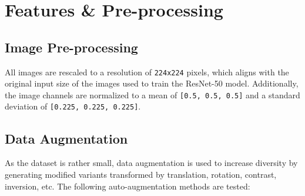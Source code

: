 \documentclass[letterpaper]{article}
\begin{document}
\section {Features \& Pre-processing}

    \subsection{Image Pre-processing}
        
        All images are rescaled to a resolution of \texttt{224x224} pixels, which aligns with the original input size of the images used to train the ResNet-50 model. Additionally, the image channels are normalized to a mean of \texttt{[0.5, 0.5, 0.5]} and a standard deviation of \texttt{[0.225, 0.225, 0.225]}. 

    \subsection{Data Augmentation}
        
        As the dataset is rather small, data augmentation is used to increase diversity by generating modified variants transformed by translation, rotation, contrast, inversion, etc. The following auto-augmentation methods are tested:
\end{document}

